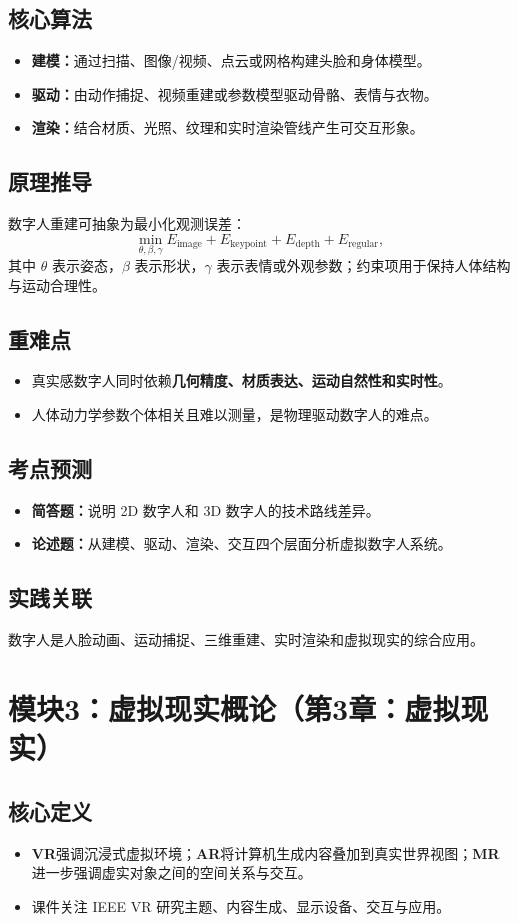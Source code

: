 \documentclass[UTF8,fontset=fandol,11pt]{ctexart}
\newcommand{\key}[1]{\textbf{#1}}
\newcommand{\exam}[1]{\textcolor{blue!55!black}{\textbf{#1}}}
\begin{document}
\subsection{核心算法}
\begin{itemize}
  \item \key{建模：}通过扫描、图像/视频、点云或网格构建头脸和身体模型。
  \item \key{驱动：}由动作捕捉、视频重建或参数模型驱动骨骼、表情与衣物。
  \item \key{渲染：}结合材质、光照、纹理和实时渲染管线产生可交互形象。
\end{itemize}
\subsection{原理推导}
数字人重建可抽象为最小化观测误差：
\[
  \min_{\theta,\beta,\gamma} E_{\text{image}}+E_{\text{keypoint}}+E_{\text{depth}}+E_{\text{regular}},
\]
其中 $\theta$ 表示姿态，$\beta$ 表示形状，$\gamma$ 表示表情或外观参数；约束项用于保持人体结构与运动合理性。
\subsection{重难点}
\begin{itemize}
  \item 真实感数字人同时依赖\key{几何精度、材质表达、运动自然性和实时性}。
  \item 人体动力学参数个体相关且难以测量，是物理驱动数字人的难点。
\end{itemize}
\subsection{考点预测}
\begin{itemize}
  \item \exam{简答题：}说明 2D 数字人和 3D 数字人的技术路线差异。
  \item \exam{论述题：}从建模、驱动、渲染、交互四个层面分析虚拟数字人系统。
\end{itemize}
\subsection{实践关联}
数字人是人脸动画、运动捕捉、三维重建、实时渲染和虚拟现实的综合应用。

\section{模块3：虚拟现实概论（第3章：虚拟现实）}
\subsection{核心定义}
\begin{itemize}
  \item \key{VR}强调沉浸式虚拟环境；\key{AR}将计算机生成内容叠加到真实世界视图；\key{MR}进一步强调虚实对象之间的空间关系与交互。
  \item 课件关注 IEEE VR 研究主题、内容生成、显示设备、交互与应用。
\end{itemize}
\end{document}
